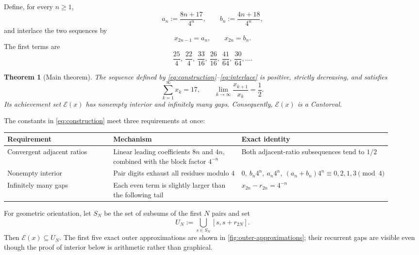 \documentclass[11pt,letterpaper]{article}
\theoremstyle{metriqthm}
\newtheorem{theorem}{Theorem}[section]
\theoremstyle{metriqdef}
\newcommand{\E}{\mathcal{E}}
\begin{document}
Define, for every $n\ge1$,
\begin{equation}\label{eq:construction}
  a_n:=\frac{8n+17}{4^n},
  \qquad
  b_n:=\frac{4n+18}{4^n},
\end{equation}
and interlace the two sequences by
\begin{equation}\label{eq:interlace}
  x_{2n-1}=a_n,
  \qquad
  x_{2n}=b_n.
\end{equation}
The first terms are
\[
  \frac{25}{4},\ \frac{22}{4},\ \frac{33}{16},\ \frac{26}{16},\
  \frac{41}{64},\ \frac{30}{64},\ldots.
\]

\begin{theorem}[Main theorem]\label{thm:main}
The sequence defined by \eqref{eq:construction}--\eqref{eq:interlace} is positive, strictly decreasing, and satisfies
\[
  \sum_{k=1}^{\infty}x_k=17,
  \qquad
  \lim_{k\to\infty}\frac{x_{k+1}}{x_k}=\frac12.
\]
Its achievement set $\E(x)$ has nonempty interior and infinitely many gaps. Consequently, $\E(x)$ is a Cantorval.
\end{theorem}

The constants in \eqref{eq:construction} meet three requirements at once:
\begin{center}
\renewcommand{\arraystretch}{1.25}
\begin{tabular}{>{\raggedright\arraybackslash}p{0.28\linewidth} >{\raggedright\arraybackslash}p{0.34\linewidth} >{\raggedright\arraybackslash}p{0.30\linewidth}}
\toprule
\sffamily\bfseries Requirement & \sffamily\bfseries Mechanism & \sffamily\bfseries Exact identity \\
\midrule
Convergent adjacent ratios & Linear leading coefficients $8n$ and $4n$, combined with the block factor $4^{-n}$ & Both adjacent-ratio subsequences tend to $1/2$ \\
Nonempty interior & Pair digits exhaust all residues modulo $4$ & $0,\ b_n4^n,\ a_n4^n,\ (a_n+b_n)4^n\equiv0,2,1,3\pmod4$ \\
Infinitely many gaps & Each even term is slightly larger than the following tail & $x_{2n}-r_{2n}=4^{-n}$ \\
\bottomrule
\end{tabular}
\end{center}

For geometric orientation, let $S_N$ be the set of subsums of the first $N$ pairs and set
\[
  U_N:=\bigcup_{s\in S_N}[s,s+r_{2N}].
\]
Then $\E(x)\subseteq U_N$. The first five exact outer approximations are shown in \cref{fig:outer-approximations}; their recurrent gaps are visible even though the proof of interior below is arithmetic rather than graphical.
\end{document}
